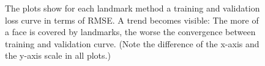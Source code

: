 \begin{figure}[H]
\begin{center}
  \hfill
  \caption[Ablation study: Landmark methods loss curves]{The plots show for each landmark method a training and validation loss curve in terms of RMSE. A trend becomes visible: The more of a face is covered by landmarks, the worse the convergence between training and validation curve. (Note the difference of the x-axis and the y-axis scale in all plots.)}
  \label{fig:LandmarksVisualComparison}
  \end{center}
\end{figure}


